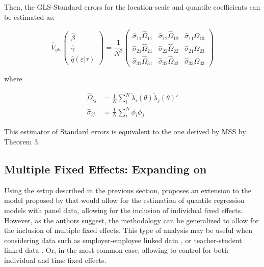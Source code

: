 \documentclass[
  authoryear,
  review,
  1p]{elsarticle}
\begin{document}
Then, the GLS-Standard errors for the location-scale and quantile
coefficients can be estimated as:

\[\hat{V}_{gls}
  \begin{pmatrix}
  \hat\beta \\
  \hat\gamma \\
  \hat q(\varepsilon|\tau)
  \end{pmatrix}
 = \frac{1}{N^2} 
 \begin{pmatrix}
 \hat\sigma_{11} \hat\Omega_{11} & \hat\sigma_{12} \hat\Omega_{12} & \hat\sigma_{11} \hat\Omega_{13} \\
 \hat\sigma_{21} \hat\Omega_{21} & \hat\sigma_{22} \hat\Omega_{22} & \hat\sigma_{21} \hat\Omega_{23} \\
 \hat\sigma_{31} \hat\Omega_{31} & \hat\sigma_{32} \hat\Omega_{32} & \hat\sigma_{33} \hat\Omega_{33}
  \end{pmatrix}
\]

where

\[\begin{aligned}
\hat\Omega_{ij} &= \frac{1}{N} \sum_i^N \tilde \lambda_{i}(\theta) \tilde \lambda_{j}(\theta)' \\
\hat\sigma_{ij} &= \frac{1}{N} \sum_i^N \phi_{i} \phi_{j}
\end{aligned}
\]

This estimator of Standard errors is equivalent to the one derived by
MSS by Theorem 3.

\hypertarget{multiple-fixed-effects-expanding-on-mss2019}{%
\subsection{\texorpdfstring{Multiple Fixed Effects: Expanding on
\citet{mss2019}}{Multiple Fixed Effects: Expanding on @mss2019}}\label{multiple-fixed-effects-expanding-on-mss2019}}

Using the setup described in the previous section, \citet{mss2019}
proposes an extension to the model proposed by \citet{he1997} that would
allow for the estimation of quantile regression models with panel data,
allowing for the inclusion of individual fixed effects. However, as the
authors suggest, the methodology can be generalized to allow for the
inclusion of multiple fixed effects. This type of analysis may be useful
when considering data such as employer-employee linked data
\citep{abowed2006}, or teacher-student linked data
\citep{harrissass2011}. Or, in the most common case, allowing to control
for both individual and time fixed effects.
\end{document}
